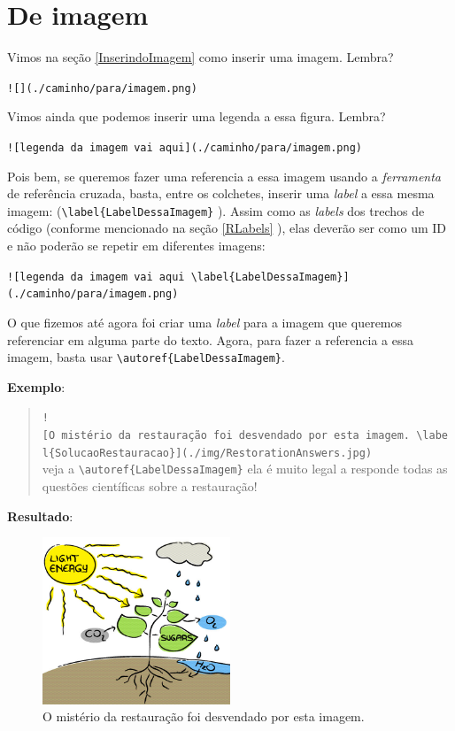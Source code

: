\documentclass[]{book}
\begin{document}
\hypertarget{de-imagem}{%
\section{De imagem}\label{de-imagem}}

Vimos na seção \ref{InserindoImagem} como inserir uma imagem. Lembra?

\texttt{!{[}{]}(./caminho/para/imagem.png)}

Vimos ainda que podemos inserir uma legenda a essa figura. Lembra?

\texttt{!{[}legenda\ da\ imagem\ vai\ aqui{]}(./caminho/para/imagem.png)}

Pois bem, se queremos fazer uma referencia a essa imagem usando a \emph{ferramenta} de referência cruzada, basta, entre os colchetes, inserir uma \emph{label} a essa mesma imagem: (\texttt{\textbackslash{}label\{LabelDessaImagem\}} ). Assim como as \emph{labels} dos trechos de código (conforme mencionado na seção \autoref{RLabels} ), elas deverão ser como um ID e não poderão se repetir em diferentes imagens:

\texttt{!{[}legenda\ da\ imagem\ vai\ aqui\ \textbackslash{}label\{LabelDessaImagem\}{]}(./caminho/para/imagem.png)}

O que fizemos até agora foi criar uma \emph{label} para a imagem que queremos referenciar em alguma parte do texto. Agora, para fazer a referencia a essa imagem, basta usar \texttt{\textbackslash{}autoref\{LabelDessaImagem\}}.

\textbf{Exemplo}:

\begin{quote}
\texttt{!{[}O\ mistério\ da\ restauração\ foi\ desvendado\ por\ esta\ imagem.\ \textbackslash{}label\{SolucaoRestauracao\}{]}(./img/RestorationAnswers.jpg)}~\\
veja a \texttt{\textbackslash{}autoref\{LabelDessaImagem\}} ela é muito legal a responde todas as questões científicas sobre a restauração!
\end{quote}

\textbf{Resultado}:

\begin{figure}
\centering
\includegraphics[width=0.5\textwidth,height=\textheight]{./img/RestorationAnswers.jpg}
\caption{O mistério da restauração foi desvendado por esta imagem. \label{SolucaoRestauracao}}
\end{figure}
\end{document}
